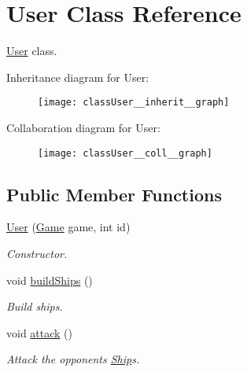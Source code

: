 \hypertarget{classUser}{}\section{User Class Reference}
\label{classUser}


\hyperlink{classUser}{User} class.  




Inheritance diagram for User\+:
\nopagebreak
\begin{figure}[H]
\begin{center}
\leavevmode
\texttt{[image: classUser\_\_inherit\_\_graph]}
\end{center}
\end{figure}


Collaboration diagram for User\+:
\nopagebreak
\begin{figure}[H]
\begin{center}
\leavevmode
\texttt{[image: classUser\_\_coll\_\_graph]}
\end{center}
\end{figure}
\subsection*{Public Member Functions}
\begin{DoxyCompactItemize}
\item 
\hyperlink{classUser_ab54a4623e9ec338ebff5de782c008c40}{User} (\hyperlink{classGame}{Game} game, int id)
\begin{DoxyCompactList}\small\item\em Constructor. \end{DoxyCompactList}\item 
void \hyperlink{classUser_a29bbf7266caac4aae7aa26acf1f19592}{build\+Ships} ()
\begin{DoxyCompactList}\small\item\em Build ships. \end{DoxyCompactList}\item 
void \hyperlink{classUser_a55aa9603904b16a22b91a357a32333ff}{attack} ()\hypertarget{classUser_a55aa9603904b16a22b91a357a32333ff}{}\label{classUser_a55aa9603904b16a22b91a357a32333ff}

\begin{DoxyCompactList}\small\item\em Attack the opponent\textquotesingle{}s \hyperlink{classShip}{Ship}\textquotesingle{}s. \end{DoxyCompactList}\end{DoxyCompactItemize}
